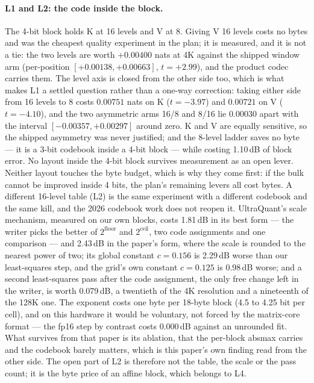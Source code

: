 \documentclass[10pt,twocolumn]{article}
\begin{document}
\paragraph{L1 and L2: the code inside the block.} The 4-bit block holds K at 16 levels and V at 8. Giving V 16 levels costs no bytes and was the cheapest quality experiment in the plan; it is measured, and it is not a tie: the two levels are worth $+0.00400$ nats at 4K against the shipped window arm (per-position $[+0.00138, +0.00663]$, $t = +2.99$), and the product codec carries them. The level axis is closed from the other side too, which is what makes L1 a settled question rather than a one-way correction: taking either side from 16 levels to 8 costs $0.00751$ nats on K ($t = -3.97$) and $0.00721$ on V ($t = -4.10$), and the two asymmetric arms 16/8 and 8/16 lie $0.00030$ apart with the interval $[-0.00357, +0.00297]$ around zero. K and V are equally sensitive, so the shipped asymmetry was never justified; and the 8-level ladder saves no byte --- it is a 3-bit codebook inside a 4-bit block --- while costing 1.10\,dB of block error. No layout inside the 4-bit block survives measurement as an open lever. Neither layout touches the byte budget, which is why they come first: if the bulk cannot be improved inside 4 bits, the plan's remaining levers all cost bytes. A different 16-level table (L2) is the same experiment with a different codebook and the same kill, and the 2026 codebook work does not reopen it. UltraQuant's scale mechanism, measured on our own blocks, costs 1.81\,dB in its best form --- the writer picks the better of $2^{\mathrm{floor}}$ and $2^{\mathrm{ceil}}$, two code assignments and one comparison --- and 2.43\,dB in the paper's form, where the scale is rounded to the nearest power of two; its global constant $c = 0.156$ is 2.29\,dB worse than our least-squares step, and the grid's own constant $c = 0.125$ is 0.98\,dB worse; and a second least-squares pass after the code assignment, the only free change left in the writer, is worth 0.079\,dB, a twentieth of the 4K resolution and a nineteenth of the 128K one. The exponent costs one byte per 18-byte block (4.5 to 4.25 bit per cell), and on this hardware it would be voluntary, not forced by the matrix-core format --- the fp16 step by contrast costs 0.000\,dB against an unrounded fit. What survives from that paper is its ablation, that the per-block absmax carries and the codebook barely matters, which is this paper's own finding read from the other side. The open part of L2 is therefore not the table, the scale or the pass count; it is the byte price of an affine block, which belongs to L4.
\end{document}
